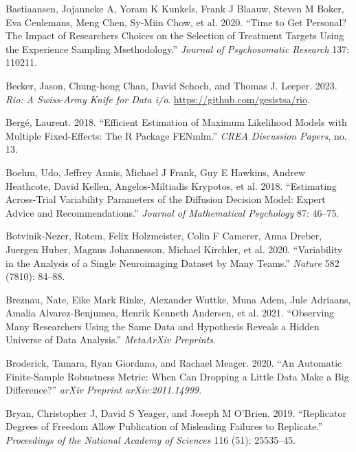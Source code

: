 \documentclass[
  letterpaper,
  DIV=11,
  numbers=noendperiod]{scrartcl}
\newlength{\cslhangindent}
\newlength{\cslentryspacingunit} %
\newenvironment{CSLReferences}[2] %
 {%
  \setlength{\parindent}{0pt}
  \ifodd #1
  \let\oldpar\par
  \def\par{\hangindent=\cslhangindent\oldpar}
  \fi
  \setlength{\parskip}{#2\cslentryspacingunit}
 }%
 {}
\begin{document}
\begin{CSLReferences}{1}{0}
\leavevmode{}%
Bastiaansen, Jojanneke A, Yoram K Kunkels, Frank J Blaauw, Steven M
Boker, Eva Ceulemans, Meng Chen, Sy-Miin Chow, et al. 2020. {``Time to
Get Personal? The Impact of Researchers Choices on the Selection of
Treatment Targets Using the Experience Sampling Msethodology.''}
\emph{Journal of Psychosomatic Research} 137: 110211.

\leavevmode{}%
Becker, Jason, Chung-hong Chan, David Schoch, and Thomas J. Leeper.
2023. \emph{Rio: A Swiss-Army Knife for Data i/o}.
\url{https://github.com/gesistsa/rio}.

\leavevmode{}%
Bergé, Laurent. 2018. {``Efficient Estimation of Maximum Likelihood
Models with Multiple Fixed-Effects: The {R} Package {FENmlm}.''}
\emph{CREA Discussion Papers}, no. 13.

\leavevmode{}%
Boehm, Udo, Jeffrey Annis, Michael J Frank, Guy E Hawkins, Andrew
Heathcote, David Kellen, Angelos-Miltiadis Krypotos, et al. 2018.
{``Estimating Across-Trial Variability Parameters of the Diffusion
Decision Model: Expert Advice and Recommendations.''} \emph{Journal of
Mathematical Psychology} 87: 46--75.

\leavevmode{}%
Botvinik-Nezer, Rotem, Felix Holzmeister, Colin F Camerer, Anna Dreber,
Juergen Huber, Magnus Johannesson, Michael Kirchler, et al. 2020.
{``Variability in the Analysis of a Single Neuroimaging Dataset by Many
Teams.''} \emph{Nature} 582 (7810): 84--88.

\leavevmode{}%
Breznau, Nate, Eike Mark Rinke, Alexander Wuttke, Muna Adem, Jule
Adriaans, Amalia Alvarez-Benjumea, Henrik Kenneth Andersen, et al. 2021.
{``Observing Many Researchers Using the Same Data and Hypothesis Reveals
a Hidden Universe of Data Analysis.''} \emph{MetaArXiv Preprints}.

\leavevmode{}%
Broderick, Tamara, Ryan Giordano, and Rachael Meager. 2020. {``An
Automatic Finite-Sample Robustness Metric: When Can Dropping a Little
Data Make a Big Difference?''} \emph{arXiv Preprint arXiv:2011.14999}.

\leavevmode{}%
Bryan, Christopher J, David S Yeager, and Joseph M O'Brien. 2019.
{``Replicator Degrees of Freedom Allow Publication of Misleading
Failures to Replicate.''} \emph{Proceedings of the National Academy of
Sciences} 116 (51): 25535--45.


\end{CSLReferences}
\end{document}
